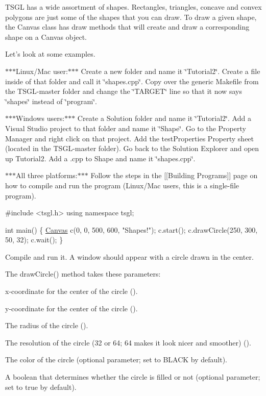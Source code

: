 T\-S\-G\-L has a wide assortment of shapes. Rectangles, triangles, concave and convex polygons are just some of the shapes that you can draw. To draw a given shape, the Canvas class has draw methods that will create and draw a corresponding shape on a Canvas object.

Let’s look at some examples.

$\ast$$\ast$$\ast$\-Linux/\-Mac user\-:$\ast$$\ast$$\ast$ Create a new folder and name it \char`\"{}\-Tutorial2\char`\"{}. Create a file inside of that folder and call it \char`\"{}shapes.\-cpp\char`\"{}. Copy over the generic Makefile from the T\-S\-G\-L-\/master folder and change the \char`\"{}\-T\-A\-R\-G\-E\-T\char`\"{} line so that it now says \char`\"{}shapes\char`\"{} instead of \char`\"{}program\char`\"{}.

$\ast$$\ast$$\ast$\-Windows users\-:$\ast$$\ast$$\ast$ Create a Solution folder and name it \char`\"{}\-Tutorial2\char`\"{}. Add a Visual Studio project to that folder and name it \char`\"{}\-Shape\char`\"{}. Go to the Property Manager and right click on that project. Add the test\-Properties Property sheet (located in the T\-S\-G\-L-\/master folder). Go back to the Solution Explorer and open up Tutorial2. Add a .cpp to Shape and name it \char`\"{}shapes.\-cpp\char`\"{}.

$\ast$$\ast$$\ast$\-All three platforms\-:$\ast$$\ast$$\ast$ Follow the steps in the \mbox{[}\mbox{[}Building Programs\mbox{]}\mbox{]} page on how to compile and run the program (Linux/\-Mac users, this is a single-\/file program).


\begin{DoxyCode}
\textcolor{preprocessor}{#include <tsgl.h>}
\textcolor{keyword}{using namespace }tsgl;

\textcolor{keywordtype}{int} main() \{
  \hyperlink{classtsgl_1_1_canvas}{Canvas} c(0, 0, 500, 600, \textcolor{stringliteral}{"Shapes!"});
  c.start();
  c.drawCircle(250, 300, 50, 32);
  c.wait();
\}
\end{DoxyCode}


Compile and run it. A window should appear with a circle drawn in the center.

The {\ttfamily draw\-Circle()} method takes these parameters\-:


\begin{DoxyItemize}
\item x-\/coordinate for the center of the circle ({}).
\item y-\/coordinate for the center of the circle ({}).
\item The radius of the circle ({}).
\item The resolution of the circle (32 or 64; 64 makes it look nicer and smoother) ({}).
\item The color of the circle (optional parameter; set to {\ttfamily B\-L\-A\-C\-K} by default).
\item A boolean that determines whether the circle is filled or not (optional parameter; set to {\ttfamily true} by default).
\end{DoxyItemize}

